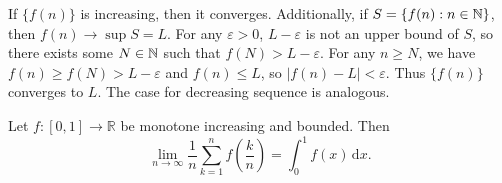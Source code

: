     \begin{proofenv}
        If $\{f(n)\}$ is increasing, then it converges. Additionally, if $S = \{f(n):n\in \mathbb{N}\}$, then $f(n) \to \sup S = L$. For any $\varepsilon > 0$, $L-\varepsilon$ is not an upper bound of $S$, so there exists some $N\in \mathbb{N}$ such that $f(N) > L-\varepsilon$. For any $n\ge N$, we have $f(n) \ge f(N) > L-\varepsilon$ and $f(n) \le L$, so $|f(n) - L| < \varepsilon$. Thus $\{f(n)\}$ converges to $L$. The case for decreasing sequence is analogous.
    \end{proofenv}
    \begin{corollaryenv}
        Let \(f:[0,1]\to \mathbb{R}\) be monotone increasing and bounded. Then
        \[
        \lim_{n\to\infty}
        \frac{1}{n}\sum_{k=1}^{n} f\left(\frac{k}{n}\right)
        =
        \int_0^1 f(x)\,\mathrm{d}x.
        \]
    \end{corollaryenv}


